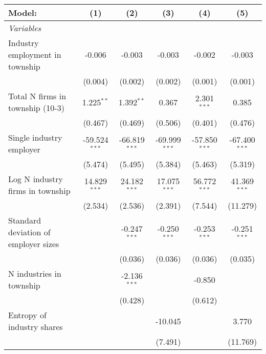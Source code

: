 \begingroup
\centering
\begin{tabular}{lccccc}
   \tabularnewline \midrule \midrule
   Model:                               & (1)             & (2)             & (3)             & (4)             & (5)\\  
   \midrule
   \emph{Variables}\\
   Industry employment in township      & -0.006          & -0.003          & -0.003          & -0.002          & -0.003\\   
                                        & (0.004)         & (0.002)         & (0.002)         & (0.001)         & (0.001)\\   
   Total N firms in township (10-3)     & 1.225$^{**}$    & 1.392$^{**}$    & 0.367           & 2.301$^{***}$   & 0.385\\   
                                        & (0.467)         & (0.469)         & (0.506)         & (0.401)         & (0.476)\\   
   Single industry employer             & -59.524$^{***}$ & -66.819$^{***}$ & -69.999$^{***}$ & -57.850$^{***}$ & -67.400$^{***}$\\   
                                        & (5.474)         & (5.495)         & (5.384)         & (5.463)         & (5.319)\\   
   Log N industry firms in township     & 14.829$^{***}$  & 24.182$^{***}$  & 17.075$^{***}$  & 56.772$^{***}$  & 41.369$^{***}$\\   
                                        & (2.534)         & (2.536)         & (2.391)         & (7.544)         & (11.279)\\   
   Standard deviation of employer sizes &                 & -0.247$^{***}$  & -0.250$^{***}$  & -0.253$^{***}$  & -0.251$^{***}$\\   
                                        &                 & (0.036)         & (0.036)         & (0.036)         & (0.035)\\   
   N industries in township             &                 & -2.136$^{***}$  &                 & -0.850          &   \\   
                                        &                 & (0.428)         &                 & (0.612)         &   \\   
   Entropy of industry shares           &                 &                 & -10.045         &                 & 3.770\\   
                                        &                 &                 & (7.491)         &                 & (11.769)\\   

\end{tabular}

